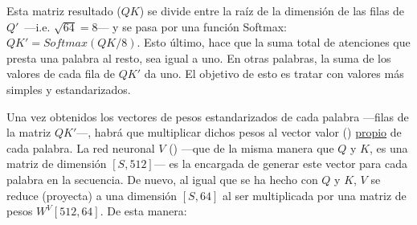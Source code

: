 \begin{figure}[H]
\end{figure}

Esta matriz resultado ($QK$) se divide entre la raíz de la dimensión de las filas de $Q'$\fnm\ ---i.e. $\sqrt{64} = 8$--- y se pasa por una función Softmax: $QK' = Softmax(QK/8)$.  Esto último, hace que la suma total de atenciones que presta una palabra al resto, sea igual a uno. En otras palabras, la suma de los valores de cada fila de $QK'$ da uno. El objetivo de esto es tratar con valores más simples y estandarizados.

Una vez obtenidos los vectores de pesos estandarizados de cada palabra ---filas de la matriz $QK'$---, habrá que multiplicar dichos pesos al vector valor () \ul{propio} de cada palabra. La red neuronal $V$ () ---que de la misma manera que $Q$ y $K$, es una matriz de dimensión $[S, 512]$--- es la encargada de generar este vector  para cada palabra en la secuencia. De nuevo, al igual que se ha hecho con $Q$ y $K$, $V$ se reduce (proyecta) a una dimensión $[S, 64]$ al ser multiplicada por una matriz de pesos $W^V[512, 64]$. De esta manera:

\bigskip

